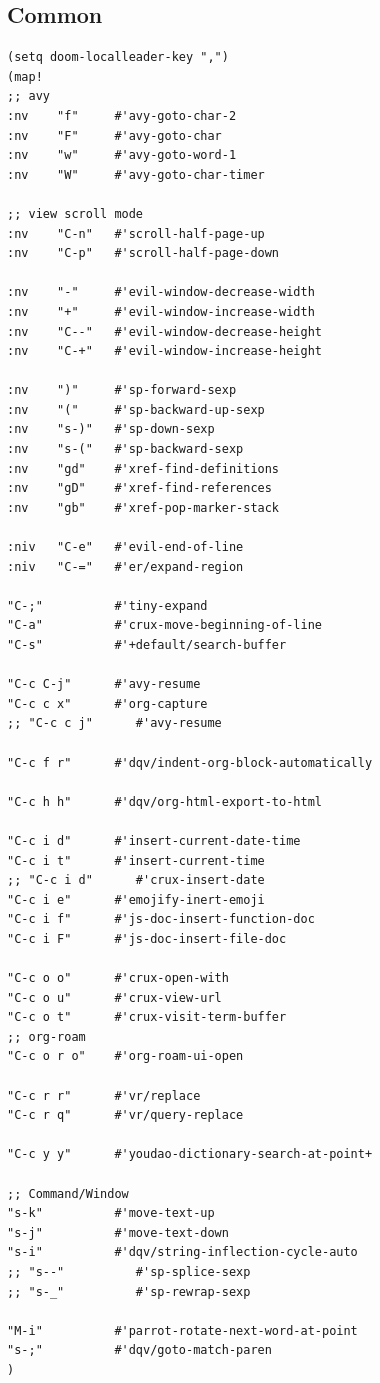 \documentclass[11pt]{article}
\begin{document}
\subsection{Common}
\label{sec:orgc89a90d}
\begin{verbatim}
(setq doom-localleader-key ",")
(map!
;; avy
:nv    "f"     #'avy-goto-char-2
:nv    "F"     #'avy-goto-char
:nv    "w"     #'avy-goto-word-1
:nv    "W"     #'avy-goto-char-timer

;; view scroll mode
:nv    "C-n"   #'scroll-half-page-up
:nv    "C-p"   #'scroll-half-page-down

:nv    "-"     #'evil-window-decrease-width
:nv    "+"     #'evil-window-increase-width
:nv    "C--"   #'evil-window-decrease-height
:nv    "C-+"   #'evil-window-increase-height

:nv    ")"     #'sp-forward-sexp
:nv    "("     #'sp-backward-up-sexp
:nv    "s-)"   #'sp-down-sexp
:nv    "s-("   #'sp-backward-sexp
:nv    "gd"    #'xref-find-definitions
:nv    "gD"    #'xref-find-references
:nv    "gb"    #'xref-pop-marker-stack

:niv   "C-e"   #'evil-end-of-line
:niv   "C-="   #'er/expand-region

"C-;"          #'tiny-expand
"C-a"          #'crux-move-beginning-of-line
"C-s"          #'+default/search-buffer

"C-c C-j"      #'avy-resume
"C-c c x"      #'org-capture
;; "C-c c j"      #'avy-resume

"C-c f r"      #'dqv/indent-org-block-automatically

"C-c h h"      #'dqv/org-html-export-to-html

"C-c i d"      #'insert-current-date-time
"C-c i t"      #'insert-current-time
;; "C-c i d"      #'crux-insert-date
"C-c i e"      #'emojify-inert-emoji
"C-c i f"      #'js-doc-insert-function-doc
"C-c i F"      #'js-doc-insert-file-doc

"C-c o o"      #'crux-open-with
"C-c o u"      #'crux-view-url
"C-c o t"      #'crux-visit-term-buffer
;; org-roam
"C-c o r o"    #'org-roam-ui-open

"C-c r r"      #'vr/replace
"C-c r q"      #'vr/query-replace

"C-c y y"      #'youdao-dictionary-search-at-point+

;; Command/Window
"s-k"          #'move-text-up
"s-j"          #'move-text-down
"s-i"          #'dqv/string-inflection-cycle-auto
;; "s--"          #'sp-splice-sexp
;; "s-_"          #'sp-rewrap-sexp

"M-i"          #'parrot-rotate-next-word-at-point
"s-;"          #'dqv/goto-match-paren
)
\end{verbatim}
\end{document}
